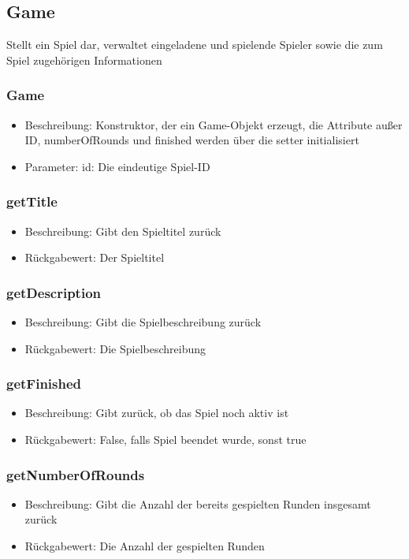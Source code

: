 \documentclass[a4paper]{scrreprt}
\begin{document}
	\subsection{Game}
	Stellt ein Spiel dar, verwaltet eingeladene und spielende Spieler sowie die zum Spiel zugehörigen Informationen
	\subsubsection{Game}
	\begin{itemize}
	\item Beschreibung: Konstruktor, der ein Game-Objekt erzeugt, die Attribute außer ID, numberOfRounds und finished werden über die setter initialisiert
	\item Parameter: id: Die eindeutige Spiel-ID
	\end{itemize}

	\subsubsection{getTitle}
	\begin{itemize}
		\item Beschreibung: Gibt den Spieltitel zurück
		\item Rückgabewert: Der Spieltitel
	\end{itemize}
	\subsubsection{getDescription}
	\begin{itemize}
		\item Beschreibung: Gibt die Spielbeschreibung zurück
		\item Rückgabewert: Die Spielbeschreibung
	\end{itemize}
	\subsubsection{getFinished}
			\begin{itemize}
				\item Beschreibung: Gibt zurück, ob das Spiel noch aktiv ist
				\item Rückgabewert: False, falls Spiel beendet wurde, sonst true
			\end{itemize}
	\subsubsection{getNumberOfRounds}
		\begin{itemize}
			\item Beschreibung: Gibt die Anzahl der bereits gespielten Runden insgesamt zurück
			\item Rückgabewert: Die Anzahl der gespielten Runden
		\end{itemize}
\end{document}
